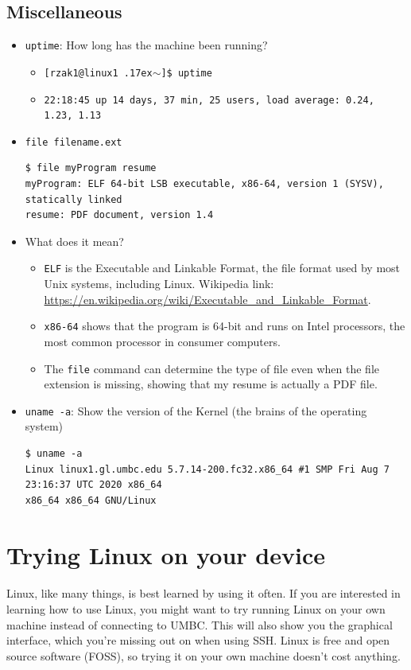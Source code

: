 \documentclass[letter,11pt]{article}
\begin{document}
\subsection{Miscellaneous}
\begin{itemize}
    \item \texttt{uptime}: How long has the machine been running?
    \begin{itemize}
        \item \texttt{[rzak1@linux1 {\raise.17ex\hbox{$\scriptstyle\sim$}}]\$ uptime}
        \item \texttt{22:18:45 up 14 days, 37 min, 25 users,  load average: 0.24, 1.23, 1.13}
    \end{itemize}
    \item \texttt{file filename.ext}
    \begin{verbatim}
$ file myProgram resume
myProgram: ELF 64-bit LSB executable, x86-64, version 1 (SYSV), statically linked
resume: PDF document, version 1.4\end{verbatim}
    \item What does it mean?
    \begin{itemize}
        \item \texttt{ELF} is the Executable and Linkable Format, the file format used by most Unix systems, including Linux. Wikipedia link: \url{https://en.wikipedia.org/wiki/Executable\_and\_Linkable\_Format}.
        \item \texttt{x86-64} shows that the program is 64-bit and runs on Intel processors, the most common processor in consumer computers.
        \item The \texttt{file} command can determine the type of file even when the file extension is missing, showing that my resume is actually a PDF file.
    \end{itemize}
    \item \texttt{uname -a}: Show the version of the Kernel (the brains of the operating system)
    \begin{verbatim}
$ uname -a
Linux linux1.gl.umbc.edu 5.7.14-200.fc32.x86_64 #1 SMP Fri Aug 7 23:16:37 UTC 2020 x86_64
x86_64 x86_64 GNU/Linux\end{verbatim}
\end{itemize}

\FloatBarrier
\section{Trying Linux on your device}
\paragraph{}Linux, like many things, is best learned by using it often. If you are interested in learning how to use Linux, you might want to try running Linux on your own machine instead of connecting to UMBC. This will also show you the graphical interface, which you're missing out on when using SSH. Linux is free and open source software (FOSS), so trying it on your own machine doesn't cost anything.
\end{document}
